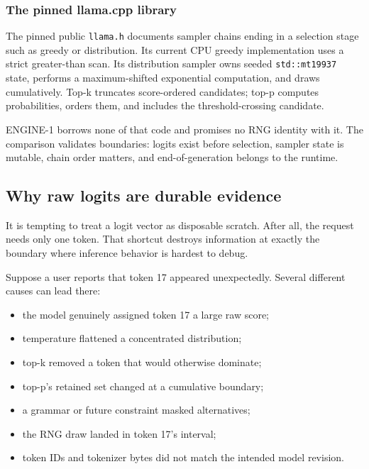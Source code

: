 \documentclass[
  10pt,
]{article}
\newcounter{none} %
\providecommand{\tightlist}{%
  \setlength{\itemsep}{0pt}\setlength{\parskip}{0pt}}
\begin{document}
\subsubsection{The pinned llama.cpp
library}\label{the-pinned-llama.cpp-library}

The pinned public \texttt{llama.h} documents sampler chains ending in a
selection stage such as greedy or distribution. Its current CPU greedy
implementation uses a strict greater-than scan. Its distribution sampler
owns seeded \texttt{std::mt19937} state, performs a maximum-shifted
exponential computation, and draws cumulatively. Top-k truncates
score-ordered candidates; top-p computes probabilities, orders them, and
includes the threshold-crossing candidate.

ENGINE-1 borrows none of that code and promises no RNG identity with it.
The comparison validates boundaries: logits exist before selection,
sampler state is mutable, chain order matters, and end-of-generation
belongs to the runtime.

\subsection{Why raw logits are durable
evidence}\label{why-raw-logits-are-durable-evidence}

It is tempting to treat a logit vector as disposable scratch. After all,
the request needs only one token. That shortcut destroys information at
exactly the boundary where inference behavior is hardest to debug.

Suppose a user reports that token 17 appeared unexpectedly. Several
different causes can lead there:

\begin{itemize}
\tightlist
\item
  the model genuinely assigned token 17 a large raw score;
\item
  temperature flattened a concentrated distribution;
\item
  top-k removed a token that would otherwise dominate;
\item
  top-p's retained set changed at a cumulative boundary;
\item
  a grammar or future constraint masked alternatives;
\item
  the RNG draw landed in token 17's interval;
\item
  token IDs and tokenizer bytes did not match the intended model
  revision.
\end{itemize}
\end{document}
